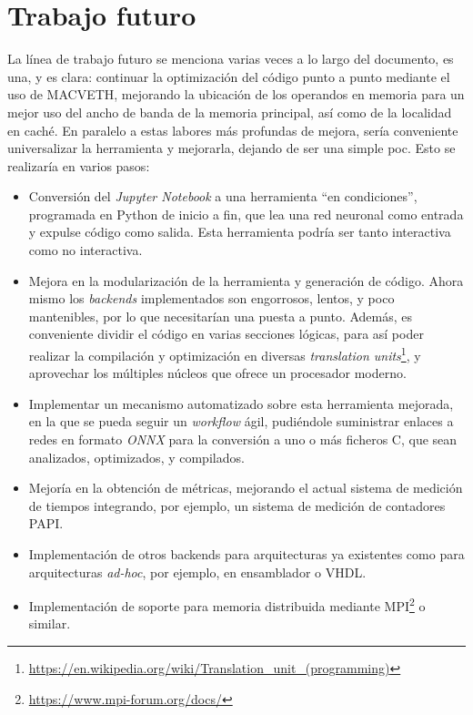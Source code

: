 \section{Trabajo futuro}
La línea de trabajo futuro se menciona varias veces a lo largo del documento, es una, y es clara: continuar la optimización del código punto a punto mediante el uso de MACVETH, mejorando la ubicación de los operandos en memoria para un mejor uso del ancho de banda de la memoria principal, así como de la localidad en caché. En paralelo a estas labores más profundas de mejora, sería conveniente universalizar la herramienta y mejorarla, dejando de ser una simple \acrshort{poc}. Esto se realizaría en varios pasos: 
\begin{itemize}
    \item Conversión del \textit{Jupyter Notebook} a una herramienta ``en condiciones'', programada en Python de inicio a fin, que lea una red neuronal como entrada y expulse código como salida. Esta herramienta podría ser tanto interactiva como no interactiva.
    \item Mejora en la modularización de la herramienta y generación de código. Ahora mismo los \textit{\gls{backend}s} implementados son engorrosos, lentos, y poco mantenibles, por lo que necesitarían una puesta a punto. Además, es conveniente dividir el código en varias secciones lógicas, para así poder realizar la compilación y optimización en diversas \textit{translation units}\footnote{\url{https://en.wikipedia.org/wiki/Translation_unit_(programming)}}, y aprovechar los múltiples núcleos que ofrece un procesador moderno.
    \item Implementar un mecanismo automatizado sobre esta herramienta mejorada, en la que se pueda seguir un \textit{workflow} ágil, pudiéndole suministrar enlaces a redes en formato \textit{ONNX} para la conversión a uno o más ficheros C, que sean analizados, optimizados, y compilados.
    \item Mejoría en la obtención de métricas, mejorando el actual sistema de medición de tiempos integrando, por ejemplo, un sistema de medición de contadores PAPI.
    \item Implementación de otros backends para arquitecturas ya existentes como para arquitecturas \textit{ad-hoc}, por ejemplo, en ensamblador o VHDL.
    \item Implementación de soporte para memoria distribuida mediante MPI\footnote{\url{https://www.mpi-forum.org/docs/}} o similar.
\end{itemize}
